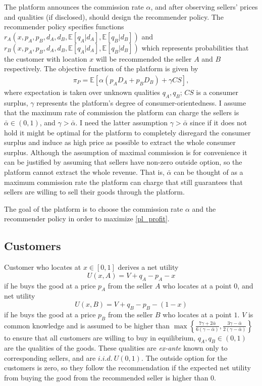 \documentclass[a4paper]{article}
\begin{document}
The platform announces the commission rate $\alpha$, and after observing sellers' prices and qualities (if disclosed), should design the recommender policy. The recommender policy specifies functions $r_A(x, p_A, p_B, d_A, d_B, \mathbb{E}[q_A|d_A], \mathbb{E}[q_B|d_B])$ and \newline
$r_B(x, p_A, p_B, d_A, d_B, \mathbb{E}[q_A|d_A], \mathbb{E}[q_B|d_B])$ which represents probabilities that the customer with location $x$ will be recommended the seller $A$ and $B$ respectively. The objective function of the platform is given by \begin{align}\label{pl_profit}
\pi_P = \mathbb{E}\left[\alpha(p_A D_A + p_B D_B) + \gamma CS\right],
\end{align}
where expectation is taken over unknown qualities $q_A, q_B$; $CS$ is a consumer surplus, $\gamma$ represents the platform's degree of consumer-orientedness. I assume that the maximum rate of commission the platform can charge the sellers is $\bar{\alpha} \in (0, 1)$, and $\gamma > \bar{\alpha}$. I need the latter assumption $\gamma > \bar{\alpha}$ since if it does not hold it might be optimal for the platform to completely disregard the consumer surplus and induce as high price as possible to extract the whole consumer surplus. Although the assumption of maximal commission is for convenience it can be justified by assuming that sellers have non-zero outside option, so the platform cannot extract the whole revenue. That is, $\bar{\alpha}$ can be thought of as a maximum commission rate the platform can charge that still guarantees that sellers are willing to sell their goods through the platform.


The goal of the platform is to choose the commission rate $\alpha$ and the recommender policy in order to maximize \eqref{pl_profit}.
	
	
	\subsection{Customers}
Customer who locates at $x \in [0, 1]$ derives a net utility $$U(x, A) =  V + q_A - p_A - x$$ if  he buys the good at a price $p_A$ from the seller $A$ who locates at a point $0$, and net utility $$U(x, B) = V + q_B - p_B - (1-x)$$ if  he buys the good at a price $p_B$ from the seller $B$ who locates at a point $1$. $V$ is common knowledge and is assumed to be higher than $\max \left\{\frac{7\gamma + 2\bar{\alpha}}{6(\gamma - \bar{\alpha})},  \frac{3 \gamma - \bar{\alpha}}{2(\gamma - \bar{\alpha})} \right\}$ to ensure that all customers are willing to buy in equilibrium, $q_A, q_B \in (0, 1)$ are the qualities of the goods. These qualities are \textit{ex-ante} known only to corresponding sellers, and are $i.i.d.\  U(0, 1)$. The outside option for the customers is zero, so they follow the recommendation if the expected net utility from buying the good from the recommended seller is higher than 0.
\end{document}
